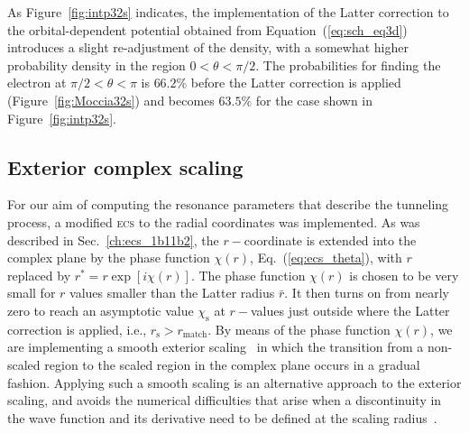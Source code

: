 As Figure~\ref{fig:intp32s} indicates, the implementation of the
Latter correction to the orbital-dependent potential obtained from
Equation~(\ref{eq:sch_eq3d}) introduces a slight re-adjustment of the
density, with a somewhat higher probability density in the region $0 <
\theta < \pi/2$. The probabilities for finding the electron at $\pi/2
< \theta < \pi$ is $66.2\%$ before the Latter correction is applied
(Figure~\ref{fig:Moccia32s}) and becomes $63.5\%$ for the case shown
in Figure~\ref{fig:intp32s}.

\subsection{Exterior complex scaling}
\label{ch:3a1_ecs}

For our aim of computing the resonance parameters that describe the
tunneling process, a modified \textsc{ecs} to the radial
coordinates was implemented. As was described in
Sec.~\ref{ch:ecs_1b11b2}, the $r-$coordinate is extended into the
complex plane by the phase function $\chi(r)$,
Eq.~(\ref{eq:ecs_theta}), with $r$ replaced by $r^{*} =
r\exp[i\chi(r)]$. The phase function $\chi(r)$ is chosen to be very
small for $r$ values smaller than the Latter radius $\bar{r}$. It then
turns on from nearly zero to reach an asymptotic value
$\chi_{\mathrm{s}}$ at $r-$values just outside where the Latter
correction is applied, i.e., $r_{\mathrm{s}} > r_{\mathrm{match}}$. By
means of the phase function $\chi(r)$, we are implementing a smooth
exterior scaling~\cite{Moiseyev_NHQM} in which the transition from a
non-scaled region to the scaled region in the complex plane occurs in
a gradual fashion. Applying such a smooth scaling is an alternative
approach to the exterior scaling, and avoids the numerical
difficulties that arise when a discontinuity in the wave function and
its derivative need to be defined at the scaling
radius~\cite{ecsScrinzi}.



